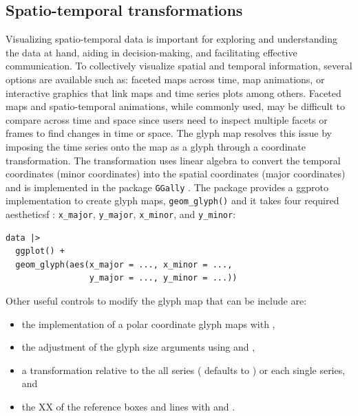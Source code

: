 \documentclass[
  shortnames]{jss}
\providecommand{\tightlist}{%
  \setlength{\itemsep}{0pt}\setlength{\parskip}{0pt}}
\begin{document}
\hypertarget{st_transformation}{%
\subsection{Spatio-temporal transformations}\label{st_transformation}}

Visualizing spatio-temporal data is important for exploring and understanding the data at hand, aiding in decision-making, and facilitating effective communication. To collectively visualize spatial and temporal information, several options are available such as: faceted maps across time, map animations, or interactive graphics that link maps and time series plots among others. Faceted maps and spatio-temporal animations, while commonly used, may be difficult to compare across time and space since users need to inspect multiple facets or frames to find changes in time or space. The glyph map \citep{Wickham2012-yr} resolves this issue by imposing the time series onto the map as a glyph through a coordinate transformation. The transformation uses linear algebra to convert the temporal coordinates (minor coordinates) into the spatial coordinates (major coordinates) and is implemented in the package \texttt{GGally} \citep{ggally}. The  package provides a ggproto implementation to create glyph maps, \texttt{geom\_glyph()} and it takes four required aestheticsf : \texttt{x\_major}, \texttt{y\_major}, \texttt{x\_minor}, and \texttt{y\_minor}:

\begin{verbatim}
data |> 
  ggplot() +
  geom_glyph(aes(x_major = ..., x_minor = ..., 
                 y_major = ..., y_minor = ...))
\end{verbatim}

Other useful controls to modify the glyph map that can be include are:

\begin{itemize}
\tightlist
\item
  the implementation of a polar coordinate glyph maps with ,
\item
  the adjustment of the glyph size arguments using  and ,
\item
  a transformation relative to the all series ( defaults to ) or each single series, and
\item
  the XX of the reference boxes and lines with  and .
\end{itemize}
\end{document}
